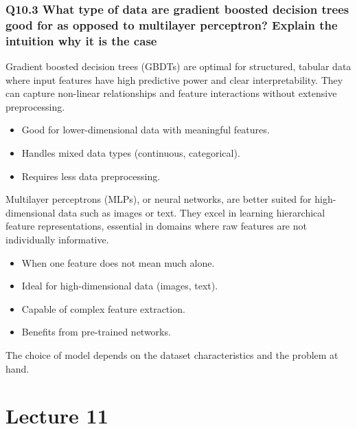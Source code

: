 \documentclass[11pt]{article}
\begin{document}
\section{Q10.3 What type of data are gradient boosted decision trees good for as opposed to multilayer perceptron? Explain the intuition why it is the case}


Gradient boosted decision trees (GBDTs) are optimal for structured, tabular data where input features have high predictive power and clear interpretability. They can capture non-linear relationships and feature interactions without extensive preprocessing.

\begin{itemize}
    \item Good for lower-dimensional data with meaningful features.
    \item Handles mixed data types (continuous, categorical).
    \item Requires less data preprocessing.
\end{itemize}

Multilayer perceptrons (MLPs), or neural networks, are better suited for high-dimensional data such as images or text. They excel in learning hierarchical feature representations, essential in domains where raw features are not individually informative.

\begin{itemize}
    \item When one feature does not mean much alone.
    \item Ideal for high-dimensional data (images, text).
    \item Capable of complex feature extraction.
    \item Benefits from pre-trained networks.
\end{itemize}

The choice of model depends on the dataset characteristics and the problem at hand.

\part{Lecture 11}
\end{document}

